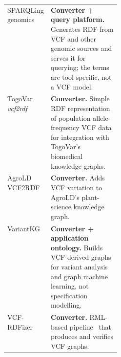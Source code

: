 \begin{table}[htbp]
\begin{tabularx}{\linewidth}{@{}>{\raggedright\arraybackslash}p{0.27\linewidth}>{\raggedright\arraybackslash}X@{}}
\\
SPARQLing genomics~\cite{janssen2020sparqlinggenomics}
& \textbf{Converter + query platform.} Generates RDF from VCF and other genomic sources and serves it for querying; the terms are tool-specific, not a VCF model.
\\
TogoVar \textit{vcf2rdf}~\cite{mitsuhashi2022togovar}
& \textbf{Converter.} Simple RDF representation of population allele-frequency VCF data for integration with TogoVar's biomedical knowledge graphs.
\\
AgroLD VCF2RDF~\cite{larmande2025agrold}
& \textbf{Converter.} Adds VCF variation to AgroLD's plant-science knowledge graph.
\\
VariantKG~\cite{prasanna2025variantkg}
& \textbf{Converter + application ontology.} Builds VCF-derived graphs for variant analysis and graph machine learning, not specification modelling.
\\
VCF-RDFizer~\cite{vcfrConverter2026}
& \textbf{Converter.} RML-based pipeline~\cite{dimou2014rml} that produces and verifies VCF graphs.
\\
\bottomrule
\end{tabularx}
\end{table}
